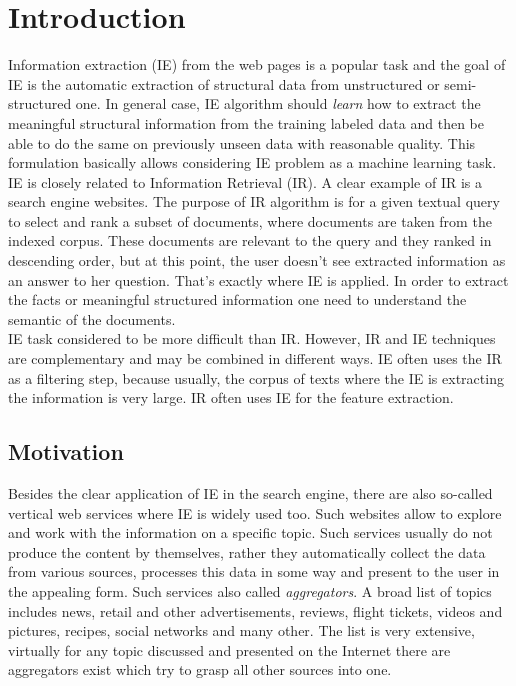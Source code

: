 \chapter{Introduction}
\label{chap:intro}
Information extraction (IE) from the web pages is a popular task and the goal of IE is the automatic extraction of structural data from unstructured or semi-structured one. In general case, IE algorithm should \textit{learn} how to extract the meaningful structural information from the training labeled data and then be able to do the same on previously unseen data with reasonable quality. This formulation basically allows considering IE problem as a machine learning task.\\

IE is closely related to Information Retrieval (IR). A clear example of IR is a search engine websites. The purpose of IR algorithm is for a given textual query to select and rank a subset of documents, where documents are taken from the indexed corpus. These documents are relevant to the query and they ranked in descending order, but at this point, the user doesn't see extracted information as an answer to her question. That's exactly where IE is applied. In order to extract the facts or meaningful structured information one need to understand the semantic of the documents.\\

IE task considered to be more difficult than IR. However, IR and IE techniques are complementary and may be combined in different ways. IE often uses the IR as a filtering step, because usually, the corpus of texts where the IE is extracting the information is very large. IR often uses IE for the feature extraction.\\
\cite{IEstate}

\section{Motivation}
Besides the clear application of IE in the search engine, there are also so-called vertical web services where IE is widely used too. Such websites allow to explore and work with the information on a specific topic. Such services usually do not produce the content by themselves, rather they automatically collect the data from various sources, processes this data in some way and present to the user in the appealing form. Such services also called \textit{aggregators}. A broad list of topics includes news, retail and other advertisements, reviews, flight tickets, videos and pictures, recipes, social networks and many other. The list is very extensive, virtually for any topic discussed and presented on the Internet there are aggregators exist which try to grasp all other sources into one. \\

